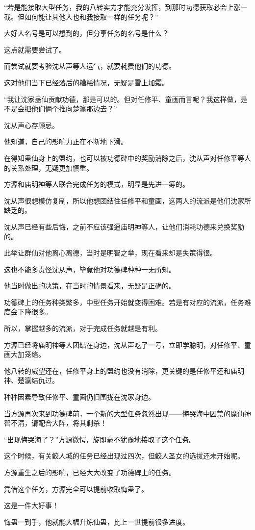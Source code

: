 \begin{this_body}
“若是能接取大型任务，我的八转实力才能充分发挥，到那时功德获取必会上涨一截。但如何能让其他人也和我接取一样的任务呢？”

大好人名号是可以想到的，但分享任务的名号是什么？

这点就需要尝试了。

而尝试就要考验沈从声等人运气，就要耗费他们的功德。

这对他们当下已经落后的糟糕情况，无疑是雪上加霜。

“我让沈家蛊仙贡献功德，那是可以的。但对任修平、童画而言呢？我这样做，是不是会把他们俩个推向楚瀛那边去？”

沈从声心存顾忌。

他知道，自己的影响力正在不断地下滑。

在得知蛊仙身上的盟约，也可以被功德碑中的奖励消除之后，沈从声对任修平等人的关系处理，无疑更加慎重。

方源和庙明神等人联合完成任务的模式，明显是先进一筹的。

沈从声很想模仿复制，所以他想团结住任修平和童画，这两人的流派是他们沈家所缺乏的。

沈从声已经有些后悔，之前不应该强逼庙明神等人，让他们消耗功德来兑换奖励的。

此举让群仙对他离心离德，当时是明智之举，现在看来却是失策得很。

这也不能多责怪沈从声，毕竟他对功德碑种种一无所知。

他当时做出的决策，在当时的情景看来，无疑是正确的。

功德碑上的任务种类繁多，中型任务开始就变得困难。若是有对应的流派，任务难度会下降很多。

所以，掌握越多的流派，对于完成任务就越是有利。

方源已经将庙明神等人团结在身边，沈从声吃了一亏，立即学聪明，对任修平、童画大加笼络。

他八转的威望还在，任修平身上的盟约也没有消除，更关键的是任修平还和庙明神、楚瀛结仇过。

种种因素导致任修平、童画仍旧围拢在沈家身边。

当方源再次来到功德碑前，一个新的大型任务忽然出现——悔哭海中囚禁的魔仙神智不清，请配合大阵，将其剿杀！

“出现悔哭海了？”方源微愕，旋即毫不犹豫地接取了这个任务。

这个时候，有关鲛人城的任务已经出现过四次，但鲛人圣女的选拔还未开始呢。

方源重生之后的影响，已经大大改变了功德碑上的任务。

凭借这个任务，方源完全可以提前收取悔蛊了。

这是一件大好事！

悔蛊一到手，他就能大幅升炼仙蛊，比上一世提前很多进度。

\end{this_body}

